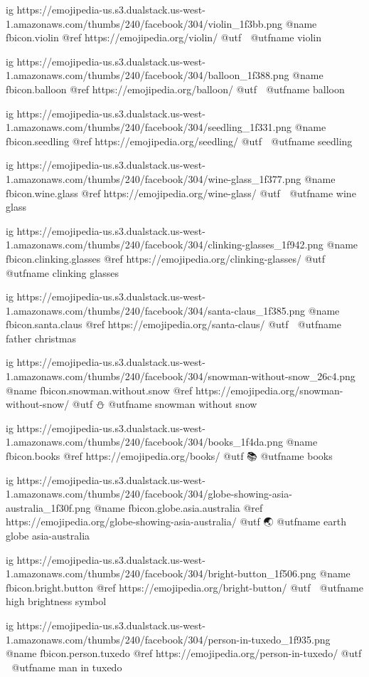   ig https://emojipedia-us.s3.dualstack.us-west-1.amazonaws.com/thumbs/240/facebook/304/violin_1f3bb.png
  @name fbicon.violin
  @ref https://emojipedia.org/violin/
  @utf 🎻
  @utfname violin

  ig https://emojipedia-us.s3.dualstack.us-west-1.amazonaws.com/thumbs/240/facebook/304/balloon_1f388.png
  @name fbicon.balloon
  @ref https://emojipedia.org/balloon/
  @utf 🎈
  @utfname balloon

  ig https://emojipedia-us.s3.dualstack.us-west-1.amazonaws.com/thumbs/240/facebook/304/seedling_1f331.png
  @name fbicon.seedling
  @ref https://emojipedia.org/seedling/
  @utf 🌱
  @utfname seedling

  ig https://emojipedia-us.s3.dualstack.us-west-1.amazonaws.com/thumbs/240/facebook/304/wine-glass_1f377.png
  @name fbicon.wine.glass
  @ref https://emojipedia.org/wine-glass/
  @utf 🍷
  @utfname wine glass

  ig https://emojipedia-us.s3.dualstack.us-west-1.amazonaws.com/thumbs/240/facebook/304/clinking-glasses_1f942.png
  @name fbicon.clinking.glasses
  @ref https://emojipedia.org/clinking-glasses/
  @utf 🥂
  @utfname clinking glasses

  ig https://emojipedia-us.s3.dualstack.us-west-1.amazonaws.com/thumbs/240/facebook/304/santa-claus_1f385.png
  @name fbicon.santa.claus
  @ref https://emojipedia.org/santa-claus/
  @utf 🎅
  @utfname father christmas

  ig https://emojipedia-us.s3.dualstack.us-west-1.amazonaws.com/thumbs/240/facebook/304/snowman-without-snow_26c4.png
  @name fbicon.snowman.without.snow
  @ref https://emojipedia.org/snowman-without-snow/
  @utf ⛄
  @utfname snowman without snow

  ig https://emojipedia-us.s3.dualstack.us-west-1.amazonaws.com/thumbs/240/facebook/304/books_1f4da.png
  @name fbicon.books
  @ref https://emojipedia.org/books/
  @utf 📚
  @utfname books

  ig https://emojipedia-us.s3.dualstack.us-west-1.amazonaws.com/thumbs/240/facebook/304/globe-showing-asia-australia_1f30f.png
  @name fbicon.globe.asia.australia
  @ref https://emojipedia.org/globe-showing-asia-australia/
  @utf 🌏
  @utfname earth globe asia-australia

  ig https://emojipedia-us.s3.dualstack.us-west-1.amazonaws.com/thumbs/240/facebook/304/bright-button_1f506.png
  @name fbicon.bright.button
  @ref https://emojipedia.org/bright-button/
  @utf 🔆
  @utfname high brightness symbol

  ig https://emojipedia-us.s3.dualstack.us-west-1.amazonaws.com/thumbs/240/facebook/304/person-in-tuxedo_1f935.png
  @name fbicon.person.tuxedo
  @ref https://emojipedia.org/person-in-tuxedo/
  @utf 🤵
  @utfname man in tuxedo

